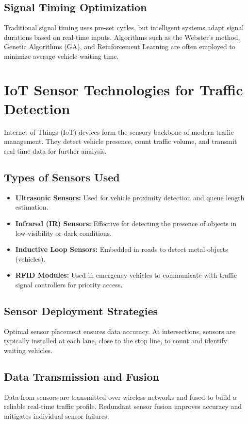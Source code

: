 \subsection{Signal Timing Optimization}
Traditional signal timing uses pre-set cycles, but intelligent systems adapt signal durations based on real-time inputs. Algorithms such as the Webster’s method, Genetic Algorithms (GA), and Reinforcement Learning are often employed to minimize average vehicle waiting time.

\section{IoT Sensor Technologies for Traffic Detection}

Internet of Things (IoT) devices form the sensory backbone of modern traffic management. They detect vehicle presence, count traffic volume, and transmit real-time data for further analysis.

\subsection{Types of Sensors Used}

\begin{itemize}
    \item \textbf{Ultrasonic Sensors:} Used for vehicle proximity detection and queue length estimation.
    \item \textbf{Infrared (IR) Sensors:} Effective for detecting the presence of objects in low-visibility or dark conditions.
    \item \textbf{Inductive Loop Sensors:} Embedded in roads to detect metal objects (vehicles).
    \item \textbf{RFID Modules:} Used in emergency vehicles to communicate with traffic signal controllers for priority access.
\end{itemize}

\subsection{Sensor Deployment Strategies}
Optimal sensor placement ensures data accuracy. At intersections, sensors are typically installed at each lane, close to the stop line, to count and identify waiting vehicles.

\subsection{Data Transmission and Fusion}
Data from sensors are transmitted over wireless networks and fused to build a reliable real-time traffic profile. Redundant sensor fusion improves accuracy and mitigates individual sensor failures.

